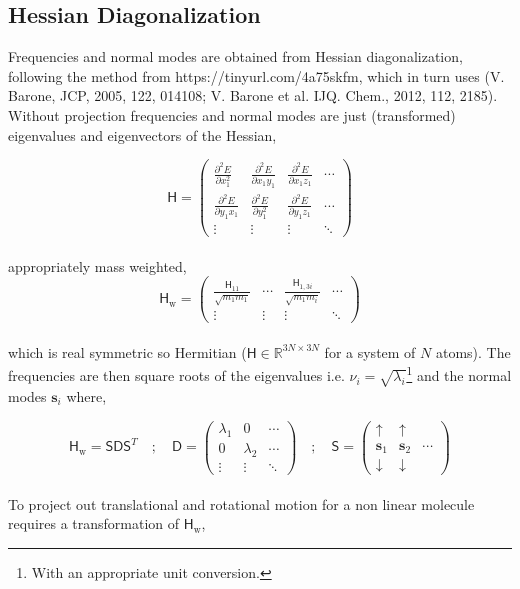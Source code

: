 \documentclass[10pt]{article}
\begin{document}
\subsection{Hessian Diagonalization}

Frequencies and normal modes are obtained from Hessian diagonalization, following the method from {\color{blue} https://tinyurl.com/4a75skfm}, which in turn uses (V. Barone, JCP, 2005, 122, 014108; V. Barone et al. IJQ. Chem., 2012, 112, 2185). Without projection frequencies and normal modes are just (transformed) eigenvalues and eigenvectors of the Hessian,

\begin{equation}
	\mathsf{H} = \begin{pmatrix}
		\frac{\partial^2 E}{\partial x_1^2} & \frac{\partial^2 E}{\partial x_1y_1} &
		\frac{\partial^2 E}{\partial x_1z_1} & \cdots\\
		\frac{\partial^2 E}{\partial y_1x_1} & \frac{\partial^2 E}{\partial y_1^2} &
		\frac{\partial^2 E}{\partial y_1z_1} & \cdots\\
		\vdots & \vdots & \vdots & \ddots
	\end{pmatrix}
\end{equation}
\\
appropriately mass weighted,
\begin{equation}
	\mathsf{H}_\text{w} = \begin{pmatrix}
		\frac{\mathsf{H}_{11}}{\sqrt{m_1 m_1}} & \cdots & \frac{\mathsf{H}_{1,3i}}{\sqrt{m_1 m_i}} & \cdots \\
		\vdots & \vdots & \vdots & \ddots
	\end{pmatrix}
\end{equation}
\\
which is real symmetric so Hermitian ($\mathsf{H} \in \mathbb{R}^{3N\times3N}$ for a system of $N$ atoms). The frequencies are then square roots of the eigenvalues i.e. $\nu_i = \sqrt{\lambda_i}$\footnote{With an appropriate unit conversion.} and the normal modes $\boldsymbol{s}_i$ where,

\begin{equation}
	\mathsf{H}_\text{w} = \mathsf{S D S}^T \quad ; \quad \mathsf{D} = \begin{pmatrix}
		\lambda_1 & 0  & \cdots \\
		0 & \lambda_2 & \cdots \\
		\vdots & \vdots & \ddots
	\end{pmatrix}
	\quad ; \quad
	\mathsf{S} = \begin{pmatrix}
		\uparrow & \uparrow &  \\
		\boldsymbol{s}_1 & \boldsymbol{s}_2 & \cdots \\
		\downarrow & \downarrow &
	\end{pmatrix}
\end{equation}
\\
To project out translational and rotational motion for a non linear molecule requires a transformation of $\mathsf{H}_\text{w}$,
\end{document}
